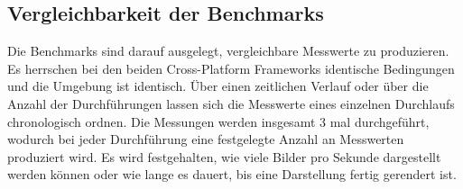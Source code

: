 \subsection*{Vergleichbarkeit der Benchmarks}

Die Benchmarks sind darauf ausgelegt, vergleichbare Messwerte zu produzieren. Es herrschen bei den beiden Cross-Platform Frameworks identische Bedingungen und die Umgebung ist identisch. Über einen zeitlichen Verlauf oder über die Anzahl der Durchführungen lassen sich die Messwerte eines einzelnen Durchlaufs chronologisch ordnen. Die Messungen werden insgesamt 3 mal durchgeführt, wodurch bei jeder Durchführung eine festgelegte Anzahl an Messwerten produziert wird. Es wird festgehalten, wie viele Bilder pro Sekunde dargestellt werden können oder wie lange es dauert, bis eine Darstellung fertig gerendert ist. 

